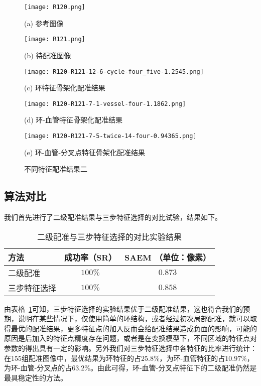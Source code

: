 \begin{figure}
\centering
\begin{minipage}[b]{0.45\linewidth} 
      \centering 
      \texttt{[image: R120.png]}
        \centerline{(a) 参考图像}\medskip
\end{minipage}
  \begin{minipage}[b]{0.45\linewidth}
    \centering
    \texttt{[image: R121.png]}
      \centerline{(b) 待配准图像}\medskip
  \end{minipage}
    \begin{minipage}[b]{0.45\linewidth}
    \centering
    \texttt{[image: R120-R121-12-6-cycle-four\_five-1.2545.png]}
      \centerline{(c) 环特征骨架化配准结果}\medskip
  \end{minipage}
  \begin{minipage}[b]{0.45\linewidth}
    \centering
    \texttt{[image: R120-R121-7-1-vessel-four-1.1862.png]}
      \centerline{(d) 环-血管特征骨架化配准结果}\medskip
  \end{minipage}
   \begin{minipage}[b]{0.45\linewidth}
    \centering
    \texttt{[image: R120-R121-7-5-twice-14-four-0.94365.png]}
      \centerline{(e) 环-血管-分叉点特征骨架化配准结果}\medskip
  \end{minipage}
 \caption{不同特征配准结果二}
\label{feature-comp2}
\end{figure}


\subsection{算法对比}
我们首先进行了二级配准结果与三步特征选择的对比试验，结果如下。
\begin{table}[!ht]
\caption{二级配准与三步特征选择的对比实验结果}
\centering
\begin{tabular}{lcc}
\toprule
方法& 成功率（SR）& SAEM （单位：像素）\\
\midrule
二级配准 & $100\%$ & $0.873$ \\
三步特征选择 & $100\%$ & $0.858$ \\        
\bottomrule
\end{tabular}
\label{methods1}
\end{table}

由表格~\ref{methods1}可知，三步特征选择的实验结果优于二级配准结果，这也符合我们的预期，说明在某些情况下，仅使用简单的环结构，或者经过初次局部配准，就可以取得最优的配准结果，更多特征点的加入反而会给配准结果造成负面的影响，可能的原因是后加入的特征点精度存在问题，或者是在变换模型下，不同区域的特征点对参数的得出具有一定的影响。另外我们对三步特征选择中各特征的比率进行统计：在155组配准图像中，最优结果为环特征的占$25.8\%$，为环-血管特征的占$10.97\%$，为环-血管-分叉点的占$63.2\%$。由此可得，环-血管-分叉点特征下的二级配准仍然是最具稳定性的方法。

